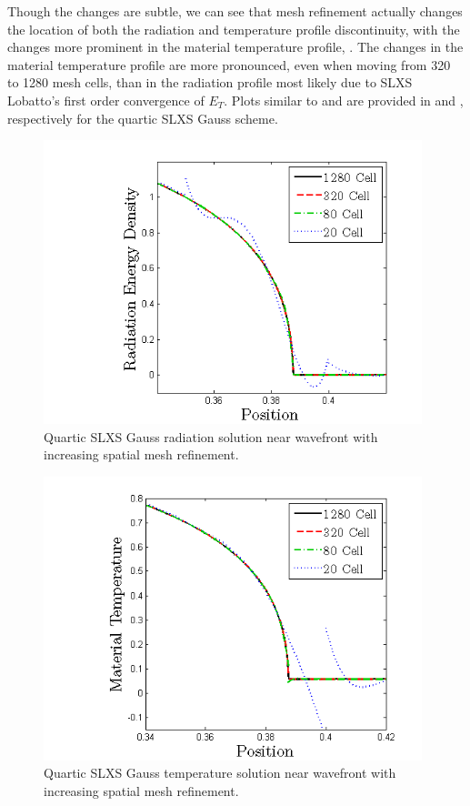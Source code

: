 Though the changes are subtle, we can see that mesh refinement actually changes the location of both the radiation and temperature profile discontinuity, with the changes more prominent in the material temperature profile, .
The changes in the material temperature profile are more pronounced, even when moving from 320 to 1280 mesh cells, than in the radiation profile most likely due to SLXS Lobatto's first order convergence of $E_{T}$.
Plots similar to  and  are provided in  and , respectively for the quartic SLXS Gauss scheme.
\begin{figure}[!hbp]
\centering
\includegraphics[width=11cm]{chapter6_grey_radtran/Dissertation_Data/Reorder_Marshak_Zoom_Radiation_SL_Gauss_P4_Cell_Refinement.png}
\caption{Quartic SLXS Gauss radiation solution near wavefront with increasing spatial mesh refinement.}
\label{fig:gauss_convergence_rad}
\end{figure}
%
%
\begin{figure}[!htp]
\centering
\includegraphics[width=11cm]{chapter6_grey_radtran/Dissertation_Data/Reorder_Marshak_Zoom_Temperature_SL_Gauss_P4_Cell_Refinement.png}
\caption{Quartic SLXS Gauss temperature solution near wavefront with increasing spatial mesh refinement.}
\label{fig:gauss_convergence_temp}
\end{figure}

